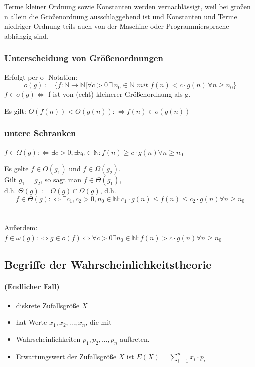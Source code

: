 \documentclass[fleqn]{scrartcl}
\begin{document}
Terme kleiner Ordnung sowie Konstanten werden vernachlässigt, weil bei großen n allein die Größenordnung ausschlaggebend ist und Konstanten und Terme niedriger Ordnung teils auch von der Maschine oder Programmiersprache abhängig sind.\\

\newpage
\subsubsection{Unterscheidung von Größenordnungen}
Erfolgt per o- Notation:
\[o(g) := \{f : \mathbb{N} \rightarrow \mathbb{N} | \forall c > 0 \, \exists \, n_0 \in \mathbb{N} \,\, mit \,\, f(n) < c \cdot g(n) \, \forall n \geq n_0\} \]
$f \in o(g) \Leftrightarrow $ f ist von (echt) kleinerer Größenordnung als g.

Es gilt: $O (f(n)) < O (g(n)) : \Leftrightarrow f(n) \in o(g(n))$

\subsubsection{untere Schranken}
$f \in \Omega (g) : \Leftrightarrow \exists c > 0, \exists n_0 \in \mathbb{N} : f(n) \geq c \cdot g(n) \forall n \geq n_0$

Es gelte $f \in O(g_1) $ und $f \in \Omega (g_2)$.\\
Gilt $g_1 = g_2$, so sagt man $f \in \Theta (g_1)$,\\
d.h. $\Theta (g) := O(g) \cap \Omega (g)$, d.h.
\[f \in \Theta (g) :\Leftrightarrow \exists c_1, c_2 > 0, n_0 \in \mathbb{N}: c_1 \cdot g(n) \leq f(n) \leq c_2 \cdot g(n) \forall n \geq n_0\]\\
\\
Außerdem: $f \in \omega(g) :\Leftrightarrow g \in o(f) \Leftrightarrow \forall c > 0 \exists n_0 \in \mathbb{N} : f(n) > c \cdot g(n) \forall n \geq n_0$

\subsection{Begriffe der Wahrscheinlichkeitstheorie}
\paragraph{(Endlicher Fall)}
\begin{itemize}
\item diskrete Zufallsgröße $X$ 
\item hat Werte $x_1, x_2, ..., x_n$, die mit
\item Wahrscheinlichkeiten $p_1, p_2, ..., p_n$ auftreten.
\item Erwartungswert der Zufallsgröße $X$ ist $E(X) = \sum\limits_{i=1}^{n} x_i \cdot p_i$
\end{itemize}
\end{document}
